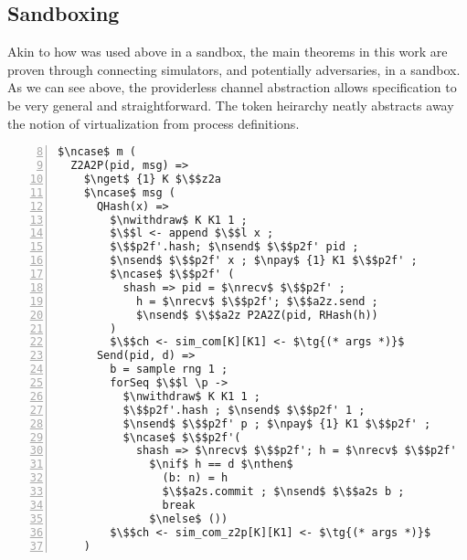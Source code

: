 \subsection{Sandboxing}
Akin to how \Fro was used above in a sandbox, the main theorems in this work are proven through connecting simulators, and potentially adversaries, in a sandbox. 
As we can see above, the providerless channel abstraction allows specification to be very general and straightforward. 
The token heirarchy neatly abstracts away the notion of virtualization from process definitions. 


\begin{lstlisting}[basicstyle=\footnotesize\BeraMonottFamily, mathescape, frame=single, numbers=left, xleftmargin=2em, xrightmargin=2em, firstnumber=8]
$\ncase$ m (
  Z2A2P(pid, msg) =>
    $\nget$ {1} K $\$$z2a
    $\ncase$ msg (
      QHash(x) => 
        $\nwithdraw$ K K1 1 ;
        $\$$l <- append $\$$l x ;
        $\$$p2f'.hash; $\nsend$ $\$$p2f' pid ; 
        $\nsend$ $\$$p2f' x ; $\npay$ {1} K1 $\$$p2f' ;
        $\ncase$ $\$$p2f' (
          shash => pid = $\nrecv$ $\$$p2f' ; 
            h = $\nrecv$ $\$$p2f'; $\$$a2z.send ; 
            $\nsend$ $\$$a2z P2A2Z(pid, RHash(h))
        )
        $\$$ch <- sim_com[K][K1] <- $\tg{(* args *)}$
      Send(pid, d) =>
        b = sample rng 1 ;
        forSeq $\$$l \p ->
          $\nwithdraw$ K K1 1 ;
          $\$$p2f'.hash ; $\nsend$ $\$$p2f' 1 ; 
          $\nsend$ $\$$p2f' p ; $\npay$ {1} K1 $\$$p2f' ;
          $\ncase$ $\$$p2f'( 
            shash => $\nrecv$ $\$$p2f'; h = $\nrecv$ $\$$p2f'
              $\nif$ h == d $\nthen$
                (b: n) = h 
                $\$$a2s.commit ; $\nsend$ $\$$a2s b ;
                break
              $\nelse$ ())
        $\$$ch <- sim_com_z2p[K][K1] <- $\tg{(* args *)}$
    )
\end{lstlisting}






